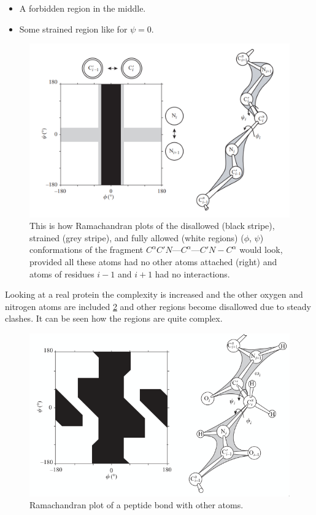 	\begin{multicols}{2}
		\begin{itemize}
			\item A forbidden region in the middle.
			\item Some strained region like for $\psi=0$.
		\end{itemize}
	\end{multicols}

	\begin{figure}[H]
		\centering
		\includegraphics[width=\textwidth]{rama_map.png}
		\caption{This is how Ramachandran plots of the disallowed (black stripe), strained (grey stripe), and fully allowed (white regions) ($\phi$, $\psi$) conformations of the fragment $C^{\alpha}C'N$---$C^{\alpha}$---$C'N-C^{\alpha}$ would look, provided all these atoms had no other atoms attached (right) and atoms of residues $i-1$ and $i+1$ had no interactions.}
		\label{fig:rama}
	\end{figure}

	Looking at a real protein the complexity is increased and the other oxygen and nitrogen atoms are included \ref{fig:ramachandran-complex} and other regions become disallowed due to steady clashes.
	It can be seen how the regions are quite complex.

	\begin{figure}[H]
		\centering
		\includegraphics[width=\textwidth]{ramachandran-complex.png}
		\caption{Ramachandran plot of a peptide bond with other atoms.}
		\label{fig:ramachandran-complex}
	\end{figure}

